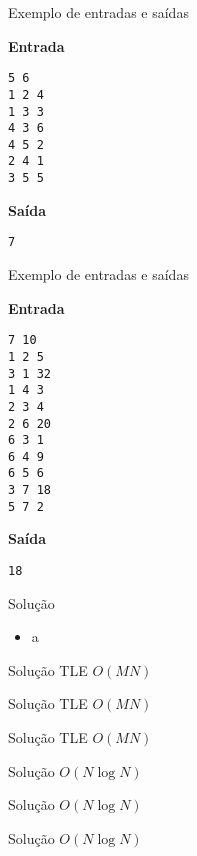 \begin{frame}[fragile]{Exemplo de entradas e saídas}

\begin{minipage}[t]{0.45\textwidth}
\textbf{Entrada}
\begin{verbatim}
5 6
1 2 4
1 3 3
4 3 6
4 5 2
2 4 1
3 5 5
\end{verbatim}
\end{minipage}
\begin{minipage}[t]{0.5\textwidth}
\textbf{Saída}
\begin{verbatim}
7
\end{verbatim}
\end{minipage}
\end{frame}

\begin{frame}[fragile]{Exemplo de entradas e saídas}

\begin{minipage}[t]{0.45\textwidth}
\textbf{Entrada}
\begin{verbatim}
7 10
1 2 5
3 1 32
1 4 3
2 3 4
2 6 20
6 3 1
6 4 9
6 5 6
3 7 18
5 7 2
\end{verbatim}
\end{minipage}
\begin{minipage}[t]{0.5\textwidth}
\textbf{Saída}
\begin{verbatim}
18
\end{verbatim}
\end{minipage}
\end{frame}


\begin{frame}[fragile]{Solução}

    \begin{itemize}
        \item a
    \end{itemize}

\end{frame}

\begin{frame}[fragile]{Solução TLE $O(MN)$}
\end{frame}

\begin{frame}[fragile]{Solução TLE $O(MN)$}
\end{frame}

\begin{frame}[fragile]{Solução TLE $O(MN)$}
\end{frame}

\begin{frame}[fragile]{Solução $O(N\log N)$}
\end{frame}

\begin{frame}[fragile]{Solução $O(N\log N)$}
\end{frame}

\begin{frame}[fragile]{Solução $O(N\log N)$}
\end{frame}

